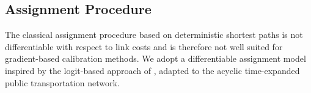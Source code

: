 \subsection{Assignment Procedure}

The classical assignment procedure based on deterministic shortest paths is not differentiable with respect to link costs and is therefore not well
suited for gradient-based calibration methods. We adopt a differentiable assignment model inspired by the logit-based
approach of , adapted to the acyclic time-expanded public transportation network.

